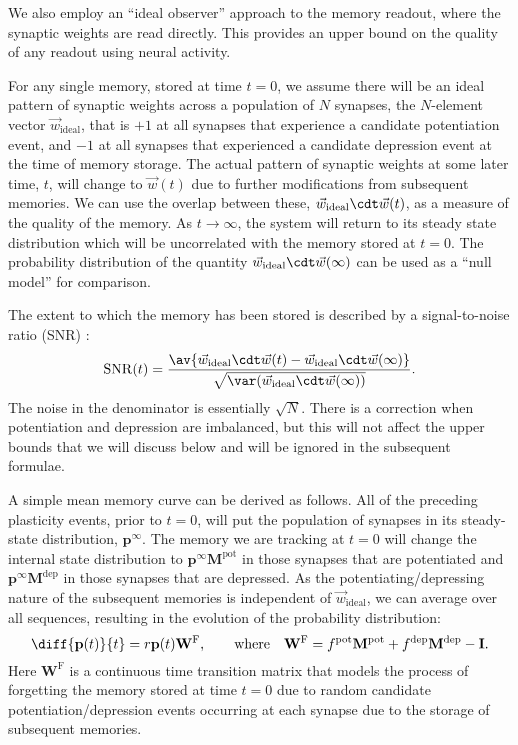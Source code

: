 \documentclass{article} %
\DeclareMathOperator{\snr}{SNR}
\newcommand{\wv}{\vec{w}}
\newcommand{\wvi}{\vec{w}_\text{ideal}}
\newcommand{\I}{\mathbf{I}}
\newcommand{\pr}{\mathbf{p}}
\newcommand{\eq}{\pr^\infty}
\newcommand{\W}{\mathbf{W}}
\newcommand{\M}{\mathbf{M}}
\newcommand{\frg}{\W^{\mathrm{F}}}
\newcommand{\pot}{^{\text{pot}}}
\newcommand{\dep}{^{\text{dep}}}
\begin{document}
We also employ an ``ideal observer'' approach to the memory readout, where the synaptic weights are read directly.
This provides an upper bound on the quality of any readout using neural activity.

For any single memory, stored at time $t=0$, we assume there will be an ideal pattern of synaptic weights across a population of $N$ synapses, the $N$-element vector $\wvi$, that is $+1$ at all synapses that experience a candidate potentiation event, and $-1$ at all synapses that experienced a candidate depression event at the time of memory storage.
The actual pattern of synaptic weights at some later time, $t$, will change to $\wv(t)$ due to further modifications from subsequent memories.
We can use the overlap between these, $\wvi\cdt\wv(t)$, as a measure of the quality of the memory.
As $t\to\infty$, the system will return to its steady state distribution which will be uncorrelated with the memory stored at $t=0$.
The probability distribution of the quantity $\wvi\cdt\wv(\infty)$ can be used as a ``null model'' for comparison.

The extent to which the memory has been stored is described by a signal-to-noise ratio (SNR) \cite{Fusi2005cascade,Fusi2007multistate,Barrett2008discrete}:
%
\begin{equation}\label{eq:SNRdef}
  \snr(t) = \frac{\av{\wv_\text{ideal}\cdt\wv(t) - \wv_\text{ideal}\cdt\wv(\infty)}}
     {\sqrt{\var(\wv_\text{ideal}\cdt\wv(\infty))}}.
\end{equation}
%
The noise in the denominator is essentially $\sqrt{N}$.
There is a correction when potentiation and depression are imbalanced, but this will not affect the upper bounds that we will discuss below and will be ignored in the subsequent formulae.

A simple mean memory curve can be derived as follows.
All of the preceding plasticity events, prior to $t=0$, will put the population of synapses in its steady-state distribution, $\eq$.
The memory we are tracking at $t=0$ will change the internal state distribution to $\eq\M\pot$ in those synapses that are potentiated and $\eq\M\dep$ in those synapses that are depressed.
As the potentiating/depressing nature of the subsequent memories is independent of $\wvi$, we can average over all sequences, resulting in the evolution of the probability distribution:
%
\begin{equation}\label{eq:evol}
  \diff{\pr(t)}{t} = r\pr(t)\frg,
  \qquad \text{where} \quad
  \frg = f\pot\M\pot + f\dep\M\dep - \I.
\end{equation}
%
Here $\frg$ is a continuous time transition matrix that models the process of forgetting the memory stored at time $t=0$ due to random candidate potentiation/depression events occurring at each synapse due to the storage of subsequent memories.
\end{document}
